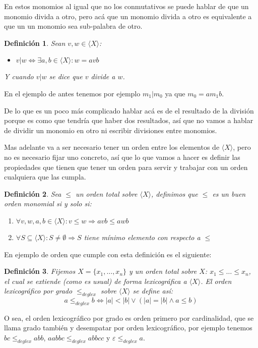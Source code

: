 \documentclass[12pt]{report}
\theoremstyle{customstyle}
\newtheorem{definition}{Definición}[chapter]
\theoremstyle{factstyle}
\begin{document}
En estos monomios al igual que no los conmutativos se puede hablar de que un monomio divida a otro, pero acá que un monomio divida a otro es equivalente a que un un monomio sea sub-palabra de otro.

\begin{definition}
  Sean $v, w ∈ ⟨X⟩$:
  \begin{itemize}
    \item $v | w ⇔ ∃a , b ∈ ⟨X⟩ : w = avb$
  \end{itemize}
  Y cuando $v | w$ se dice que $v$ divide a $w$.
\end{definition}

En el ejemplo de antes tenemos por ejemplo $m_1 | m_0$ ya que $m_0 = a m_1 b$.

De lo que es un poco más complicado hablar acá es de el resultado de la división porque es como que tendría que haber dos resultados, así que no vamos a hablar de dividir un monomio en otro ni escribir divisiones entre monomios.

Mas adelante va a ser necesario tener un orden entre los elementos de $⟨X⟩$, pero no es necesario fijar uno concreto, así que lo que vamos a hacer es definir las propiedades que tienen que tener un orden para servir y trabajar con un orden cualquiera que las cumpla.

\begin{definition}
  Sea $≤$ un orden total sobre $⟨X⟩$, definimos que $≤$ es un buen orden monomial si y solo si:
  \begin{enumerate}
    \item $∀v, w, a, b ∈ ⟨X⟩ : v ≤ w ⇒ avb ≤ awb$
    \item $∀S ⊆ ⟨X⟩ : S ≠ ∅ ⇒ S$ tiene mínimo elemento con respecto a $≤$
  \end{enumerate}
\end{definition}

En ejemplo de orden que cumple con esta definición es el siguiente:

\begin{definition}
  Fijemos $X = \{x_1, …, x_n\}$ y un orden total sobre $X$: $x_1 ≤ … ≤ x_n$, el cual se extiende (como es usual) de forma lexicográfica a $⟨X⟩$. El orden lexicográfico por grado $ ≤_{deglex}$ sobre $⟨X⟩$ se define así:
  \[ a ≤_{deglex} b ⇔ |a| < |b| ∨ (|a| = |b| ∧ a ≤ b) \]
\end{definition}

O sea, el orden lexicográfico por grado es orden primero por cardinalidad, que se llama grado también y desempatar por orden lexicográfico, por ejemplo tenemos $bc ≤_{deglex} abb$, $aabbc ≤_{deglex} abbcc$ y $ε ≤_{deglex} a$.
\end{document}
